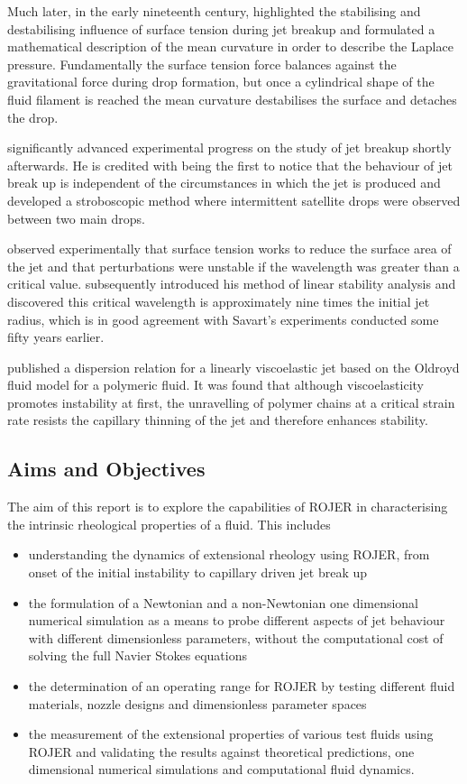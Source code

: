 \documentclass[11pt]{article}
\begin{document}
Much later, in the early nineteenth century, \cite{young1805essay} highlighted 
the stabilising and destabilising influence of surface tension during jet 
breakup and \cite{laplace1805traite} formulated a mathematical description of 
the mean curvature in order to describe the Laplace pressure. Fundamentally the 
surface tension force balances against the gravitational force during drop 
formation, but once a cylindrical shape of the fluid filament is reached the 
mean curvature destabilises the surface and detaches the drop.

\cite{savart1833memoire} significantly advanced experimental progress on the 
study of jet breakup shortly afterwards. He is credited with being the first to 
notice that the behaviour of jet break up is independent of the circumstances 
in which the jet is produced and developed a stroboscopic method where 
intermittent satellite drops were observed between two main drops. 

\cite{plateau1873statique} observed experimentally that surface tension works 
to reduce the surface area of the jet and that perturbations were unstable if 
the wavelength was greater than a critical value. \cite{strutt1878instability} 
subsequently introduced his method of linear stability analysis and discovered 
this critical wavelength is approximately nine times the initial jet radius, 
which is in good agreement with Savart's experiments conducted some fifty years 
earlier.

\cite{middleman1965stability} published a dispersion relation for a linearly 
viscoelastic jet based on the Oldroyd fluid model for a polymeric fluid. It was 
found that although viscoelasticity promotes instability at first, the 
unravelling of polymer chains at a critical strain rate resists the capillary 
thinning of the jet and therefore enhances stability.

\subsection{Aims and Objectives}
The aim of this report is to explore the capabilities of ROJER in 
characterising the intrinsic rheological properties of a fluid. This includes
\begin{itemize}
\item understanding the dynamics of extensional rheology using ROJER, from 
onset of the initial instability to capillary driven jet break up
\item the formulation of a Newtonian and a non-Newtonian one dimensional 
numerical simulation as a means to probe different aspects of jet behaviour 
with different dimensionless parameters, without the computational cost of 
solving the full Navier Stokes equations
\item the determination of an operating range for ROJER by testing different 
fluid materials, nozzle designs and dimensionless parameter spaces
\item the measurement of the extensional properties of various test fluids 
using ROJER and validating the results against theoretical predictions, one 
dimensional numerical simulations and computational fluid dynamics. 
\end{itemize}
\end{document}
